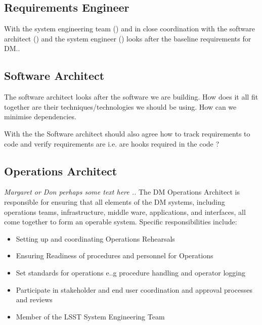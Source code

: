 \subsection{Requirements Engineer \label{role:reqeng}}
With the system engineering team () and in close coordination with the software architect () and the system engineer () looks after the baseline requirements for DM.. 




\subsection{Software Architect \label{role:softarc}}
The software architect looks after the software we are building. How does it all fit together are their techniques/technologies we should be using. How can we minimise dependencies. 

With the  the Software architect should also agree how to track requirements to code and verify requirements are i.e. are hooks required in the code ?

\subsection{Operations Architect \label{role:opsarc}}
{\em Margaret  or Don perhaps some text here .. }
The DM Operations  Architect is responsible for ensuring that all elements of the DM systems, including operations teams, infrastructure, middle ware, applications, and interfaces, 
all come together to form an operable system. 
Specific responsibilities include:
\begin{itemize}
\item Setting up and coordinating  Operations Rehearsals
\item Ensuring Readiness of procedures and personnel for Operations
\item Set standards for operations e..g procedure handling and operator logging
\item Participate in stakeholder and end user coordination and approval processes and reviews
\item Member of the LSST System Engineering Team
\end{itemize}



